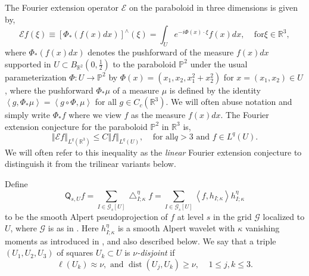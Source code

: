 \documentclass{amsart}%
\theoremstyle{plain}
\numberwithin{equation}{section}
\begin{document}
The Fourier extension operator $\mathcal{E}$ on the paraboloid in three
dimensions is given by,%
\[
\mathcal{E}f\left(  \xi\right)  \equiv\left[  \Phi_{\ast}\left(  f\left(
x\right)  dx\right)  \right]  ^{\wedge}\left(  \xi\right)  =\int_{U}%
e^{-i\Phi\left(  x\right)  \cdot\xi}f\left(  x\right)  dx,\ \ \ \ \ \text{for
}\xi\in\mathbb{R}^{3},
\]
where $\Phi_{\ast}\left(  f\left(  x\right)  dx\right)  $ denotes the
pushforward of the measure $f\left(  x\right)  dx$ supported in $U\subset
B_{\mathbb{R}^{2}}\left(  0,\frac{1}{2}\right)  $ to the paraboloid
$\mathbb{P}^{2}$ under the usual parameterization $\Phi:U\rightarrow
\mathbb{P}^{2}$ by $\Phi\left(  x\right)  =\left(  x_{1},x_{2},x_{1}^{2}%
+x_{2}^{2}\right)  $ for $x=\left(  x_{1},x_{2}\right)  \in U$, where the
pushforward $\Phi_{\ast}\mu$ of a measure $\mu$ is defined by the identity
$\left\langle g,\Phi_{\ast}\mu\right\rangle =\left\langle g\circ\Phi
,\mu\right\rangle $ for all $g\in C_{c}\left(  \mathbb{R}^{3}\right)  $. We
will often abuse notation and simply write $\Phi_{\ast}f$ where we view $f$ as
the measure $f\left(  x\right)  dx$. The Fourier extension conjecture for the
paraboloid $\mathbb{P}^{2}$ in $\mathbb{R}^{3}$ is,%
\begin{equation}
\left\Vert \mathcal{E}f\right\Vert _{L^{q}\left(  \mathbb{R}^{3}\right)  }\leq
C\left\Vert f\right\Vert _{L^{q}\left(  U\right)  },\ \ \ \ \ \text{for all
}q>3\text{ and }f\in L^{q}\left(  U\right)  .\label{FEC}%
\end{equation}
We will often refer to this inequality as the \emph{linear} Fourier extension
conjecture to distinguish it from the trilinear variants below.

Define
\[
\mathsf{Q}_{s,U}f=\sum_{I\in\mathcal{G}_{s}\left[  U\right]  }\bigtriangleup
_{I;\kappa}^{\eta}f=\sum_{I\in\mathcal{G}_{s}\left[  U\right]  }\left\langle
f,h_{I;\kappa}\right\rangle h_{I;\kappa}^{\eta}%
\]
to be the smooth Alpert pseudoprojection of $f$ at level $s$ in the grid
$\mathcal{G}$ localized to $U$, where $\mathcal{G}$ is as in \cite{RiSa3}.
Here $h_{I;\kappa}^{\eta}$ is a smooth Alpert wavelet with $\kappa$ vanishing
moments as introduced in \cite{Saw7}, and also described below. We say that a
triple $\left(  U_{1},U_{2},U_{3}\right)  $ of squares $U_{k}\subset U$ is
$\nu$\emph{-disjoint} if%
\begin{equation}
\ell\left(  U_{k}\right)  \approx\nu,\text{ and }\operatorname*{dist}\left(
U_{j},U_{k}\right)  \geq\nu,\ \ \ \ \ 1\leq j,k\leq3.\label{nu disjoint'}%
\end{equation}
\end{document}
